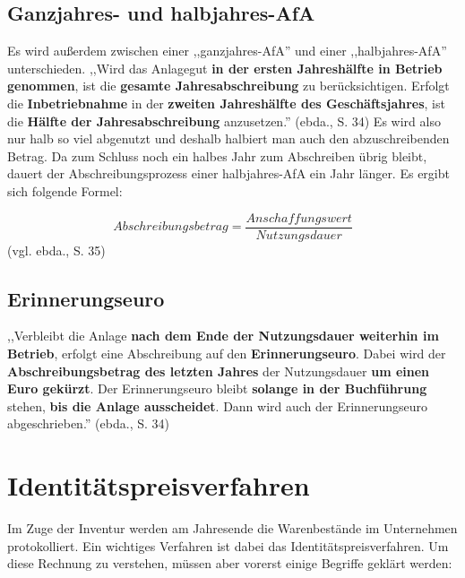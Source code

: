 \documentclass[12pt]{report}
\begin{document}
\subsection{Ganzjahres- und halbjahres-AfA}
Es wird außerdem zwischen einer ,,ganzjahres-AfA'' und einer ,,halbjahres-AfA'' unterschieden. ,,Wird das Anlagegut \textbf{in der ersten Jahreshälfte in Betrieb genommen}, ist die \textbf{gesamte Jahresabschreibung} zu berücksichtigen. Erfolgt die \textbf{Inbetriebnahme} in der \textbf{zweiten Jahreshälfte des Geschäftsjahres}, ist die \textbf{Hälfte der Jahresabschreibung} anzusetzen.'' (ebda., S. 34\nocite{RW4})
Es wird also nur halb so viel abgenutzt und deshalb halbiert man auch den abzuschreibenden Betrag. Da zum Schluss noch ein halbes Jahr zum Abschreiben übrig bleibt, dauert der Abschreibungsprozess einer halbjahres-AfA ein Jahr länger. Es ergibt sich folgende Formel:


\begin{equation}
	Abschreibungsbetrag = \frac{Anschaffungswert}{Nutzungsdauer}
\end{equation} (vgl. ebda., S. 35\nocite{RW4})

\subsection{Erinnerungseuro}
,,Verbleibt die Anlage \textbf{nach dem Ende der Nutzungsdauer weiterhin im Betrieb}, erfolgt eine Abschreibung auf den \textbf{Erinnerungseuro}. Dabei wird der \textbf{Abschreibungsbetrag des letzten Jahres} der Nutzungsdauer \textbf{um einen Euro gekürzt}. Der Erinnerungseuro bleibt \textbf{solange in der Buchführung} stehen, \textbf{bis die Anlage ausscheidet}. Dann wird auch der Erinnerungseuro abgeschrieben.'' (ebda., S. 34\nocite{RW4})

\section{Identitätspreisverfahren}

Im Zuge der Inventur werden am Jahresende die Warenbestände im Unternehmen protokolliert. Ein wichtiges Verfahren ist dabei das Identitätspreisverfahren. Um diese Rechnung zu verstehen, müssen aber vorerst einige Begriffe geklärt werden:
\end{document}
